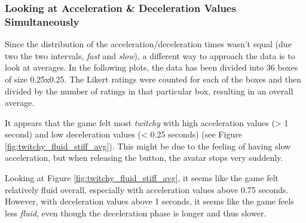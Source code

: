 



\subsubsection{Looking at Acceleration \& Deceleration Values Simultaneously}
Since the distribution of the acceleration/deceleration times wasn't equal (due two the two intervals, \textit{fast} and \textit{slow}), a different way to approach the data is to look at averages. In the following plots, the data has been divided into 36 boxes of size 0.25x0.25. The Likert ratings were counted for each of the boxes and then divided by the number of ratings in that particular box, resulting in an overall average.

It appears that the game felt most \textit{twitchy} with high acceleration values (> 1 second) and low deceleration values (< 0.25 seconds) (see Figure \ref{fig:twitchy_fluid_stiff_avg}). This might be due to the feeling of having slow acceleration, but when releasing the button, the avatar stops very suddenly.

Looking at Figure \ref{fig:twitchy_fluid_stiff_avg}, it seems like the game felt relatively fluid overall, especially with acceleration values above 0.75 seconds. However, with deceleration values above 1 seconds, it seems like the game feels less \textit{fluid}, even though the deceleration phase is longer and thus slower.

